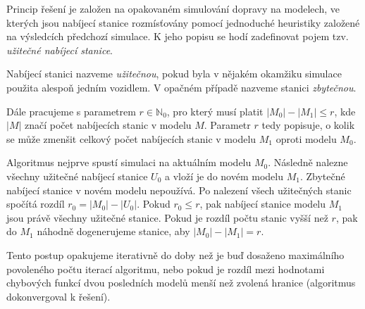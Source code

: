 Princip řešení je založen na opakovaném simulování dopravy na modelech, ve 
kterých jsou nabíjecí stanice rozmísťovány pomocí jednoduché heuristiky 
založené na výsledcích předchozí simulace. K jeho popisu se hodí zadefinovat
pojem tzv. \emph{užitečné nabíjecí stanice}.

\begin{defn}\label{def:uzitecna_stanice}
    Nabíjecí stanici nazveme \emph{užitečnou}, pokud byla v nějakém okamžiku
    simulace použita alespoň jedním vozidlem. V opačném případě nazveme stanici 
    \emph{zbytečnou}.
\end{defn}

Dále pracujeme s parametrem $r \in \mathbb{N}_0$, pro který musí platit
$|M_0| - |M_1| \leq r$, kde $|M|$ značí počet nabíjecích stanic v modelu $M$.
Parametr $r$ tedy popisuje, o kolik se může zmenšit celkový počet nabíjecích 
stanic v modelu $M_1$ oproti modelu $M_0$.

Algoritmus nejprve spustí simulaci na aktuálním modelu $M_0$. Následně nalezne
všechny užitečné nabíjecí stanice $U_0$ a vloží je do novém modelu $M_1$. Zbytečné 
nabíjecí stanice v novém modelu nepoužívá. Po nalezení všech užitečných stanic 
spočítá rozdíl $r_0 = |M_0| - |U_0|$. Pokud $r_0 \leq r$, pak nabíjecí stanice
modelu $M_1$ jsou právě všechny užitečné stanice. Pokud je rozdíl počtu stanic 
vyšší než $r$, pak do $M_1$ náhodně dogenerujeme stanice, aby $|M_0| - |M_1| = r$.

Tento postup opakujeme iterativně do doby než je buď dosaženo maximálního
povoleného počtu iterací algoritmu, nebo pokud je rozdíl mezi hodnotami chybových funkcí dvou posledních 
modelů menší než zvolená hranice (algoritmus dokonvergoval k řešení).

